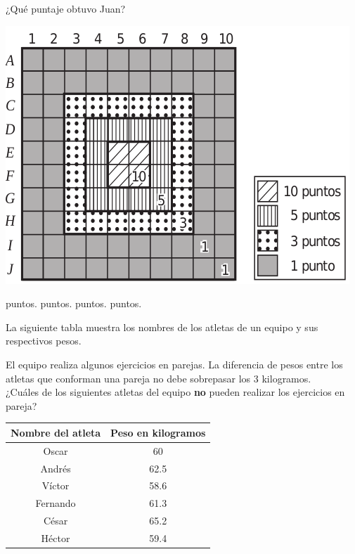 \documentclass[10pt,letterpaper,addpoints]{exam}
\begin{document}
\begin{questions}
\begin{minipage}{.35\textwidth}
¿Qué puntaje obtuvo Juan?
\end{minipage}\hfill
\begin{minipage}{.65\textwidth}
\begin{center}
\includegraphics[scale=.50]{Images/juego_dados.png} 
\end{center}
\end{minipage}

\begin{oneparchoices}
 puntos.
 puntos.
 puntos.
 puntos.
\end{oneparchoices}

\begin{minipage}{.5\textwidth}
\question 
La siguiente tabla muestra los nombres de los atletas de un equipo y sus respectivos pesos.

El equipo realiza algunos ejercicios en parejas. La diferencia de pesos entre los atletas que conforman una pareja no debe sobrepasar los 3 kilogramos.\\

¿Cuáles de los siguientes atletas del equipo \textbf{no} pueden realizar los ejercicios en pareja?
\end{minipage}\hfill
\begin{minipage}{.5\textwidth}
\begin{tabular}{|c|c|}
\hline 
\textbf{Nombre del atleta} & \textbf{Peso en kilogramos} \\ 
\hline 
Oscar & 60 \\ 
\hline 
Andrés & 62.5 \\ 
\hline 
Víctor & 58.6 \\ 
\hline 
Fernando & 61.3 \\ 
\hline 
César & 65.2 \\ 
\hline 
Héctor & 59.4 \\ 
\hline 
\end{tabular} 
\end{minipage}


\end{questions}
\end{document}
